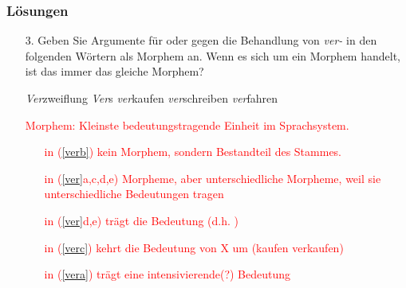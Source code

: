 \begin{frame}
\frametitle{Lösungen}
\begin{itemize}
	\item[3.] Geben Sie Argumente für oder gegen die Behandlung von \emph{ver-} in den folgenden Wörtern als Morphem an. Wenn es sich um ein Morphem handelt, ist das immer das gleiche Morphem? %
	
	\eal \label{ver}
	\ex\label{vera}  \emph{Ver}zweiflung
	\ex\label{verb} \emph{Ver}s
	\ex \label{verc} \emph{ver}kaufen
	\ex\label{verd}  \emph{ver}schreiben
	\ex\label{vere} \emph{ver}fahren
	\zl
	
	\textcolor{red}{
		Morphem: Kleinste bedeutungstragende Einheit im Sprachsystem.	
		\begin{itemize}
			\item[]  in (\ref{verb})  \ras kein Morphem, sondern Bestandteil des Stammes.
			\item[]  in (\ref{ver}a,c,d,e) \ras Morpheme, aber unterschiedliche Morpheme, weil sie unterschiedliche Bedeutungen tragen
			\item[]  in (\ref{ver}d,e) trägt die Bedeutung  (d.h. )
			\item[]  in (\ref{verc}) kehrt die Bedeutung von X um (kaufen \ras verkaufen)
			\item[]  in (\ref{vera}) trägt eine intensivierende(?) Bedeutung
		\end{itemize}
	}
\end{itemize}
\end{frame}



